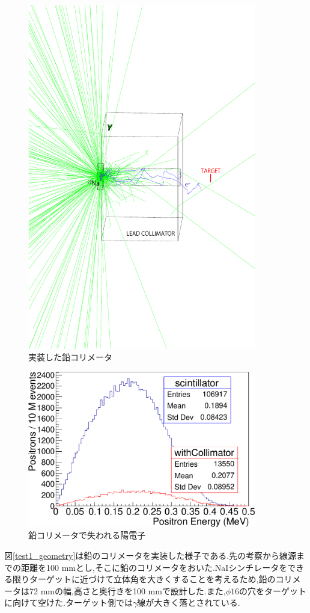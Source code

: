 \begin{figure}[htbp]
	\centering
		\includegraphics[width=10cm]{img/test1b_geometry.pdf}
	\caption{実装した鉛コリメータ}
	\label{test1b_geometry}
\end{figure}

\begin{figure}[htbp]
	\centering
		\includegraphics[width=10cm]{fig/collimator_loss.pdf}
	\caption{鉛コリメータで失われる陽電子}
	\label{collimator_loss}
\end{figure}

図\ref{test1_geometry}は鉛のコリメータを実装した様子である.先の考察から線源までの距離を100 mmとし,そこに鉛のコリメータをおいた.NaIシンチレータをできる限りターゲットに近づけて立体角を大きくすることを考えるため,鉛のコリメータは72 mmの幅,高さと奥行きを100 mmで設計した.また,$\phi16$の穴をターゲットに向けて空けた.ターゲット側では$\gamma$線が大きく落とされている.

